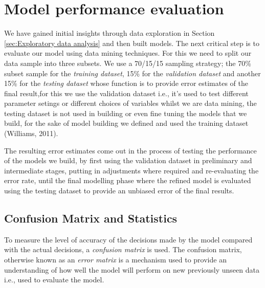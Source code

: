 \documentclass{DissertateUSU}
\begin{document}
\section{Model performance evaluation}

We have gained initial insights through data exploration in Section
\ref{sec:Exploratory data analysis} and then built models. The next
critical step is to evaluate our model using data mining techniques. For
this we need to split our data sample into three subsets. We use a
70/15/15 sampling strategy; the 70\% subset sample for the
\emph{training dataset}, 15\% for the \emph{validation dataset} and
another 15\% for the \emph{testing dataset} whose function is to provide
error estimates of the final result,for this we use the validation
dataset i.e., it's used to test different parameter setings or different
choices of variables whilst we are data mining, the testing dataset is
not used in building or even fine tuning the models that we build, for
the sake of model building we defined and used the training dataset
(Williams, 2011).\medskip    

The resulting error estimates come out in the process of testing the
performance of the models we build, by first using the validation
dataset in preliminary and intermediate stages, putting in adjustments
where required and re-evaluating the error rate, until the final
modelling phase where the refined model is evaluated using the testing
dataset to provide an unbiased error of the final results. \medskip

\singlespacing

\doublespacing

\subsection{Confusion Matrix and Statistics}

To measure the level of accuracy of the decisions made by the model
compared with the actual decisions, a \emph{confusion matrix} is used.
The confusion matrix, otherwise known as an \emph{error matrix} is a
mechanism used to provide an understanding of how well the model will
perform on new previously unseen data i.e., used to evaluate the model.
\end{document}

